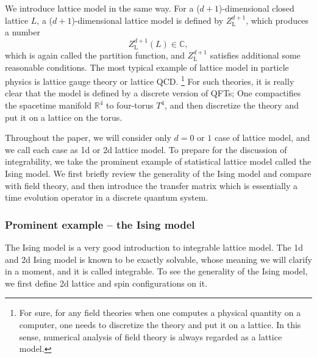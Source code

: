 We introduce lattice model in the same way. For a ($d+1$)-dimensional
closed lattice $L$, a ($d+1$)-dimensional lattice model is defined
by $Z_{\mathrm{L}}^{d+1}$, which produces a number 
\begin{equation}
  Z_{\mathrm{L}}^{d+1}\left(L\right)  \in  \mathbb{C},
\end{equation}
which is again called the partition function, and $Z_{\mathrm{L}}^{d+1}$
satisfies additional some reasonable conditions. The most typical
example of lattice model in particle physics is lattice gauge theory
or lattice QCD.%
%
\footnote{For sure, for any field theories when one computes a physical quantity
on a computer, one needs to discretize the theory and put it on a
lattice. In this sense, numerical analysis of field theory is always
regarded as a lattice model. }
%
 For such theories, it is really clear that the model is defined by
a discrete version of QFTs; One compactifies the spacetime manifold
$\mathbb{R}^{4}$ to four-torus $T^{4}$, and then discretize the
theory and put it on a lattice on the torus. 

Throughout the paper, we will consider only $d=0$ or $1$ case of
lattice model, and we call each case as 1d or 2d lattice model. To
prepare for the discussion of integrability, we take the prominent
example of statistical lattice model called the Ising model. We first
briefly review the generality of the Ising model and compare with
field theory, and then introduce the transfer matrix which is essentially
a time evolution operator in a discrete quantum system. 





\subsubsection{Prominent example -- the Ising model}

The Ising model is a very good introduction to integrable lattice
model. The 1d and 2d Ising model is known to be exactly solvable,
whose meaning we will clarify in a moment, and it is called integrable.
To see the generality of the Ising model, we first define 2d lattice
and spin configurations on it. 

